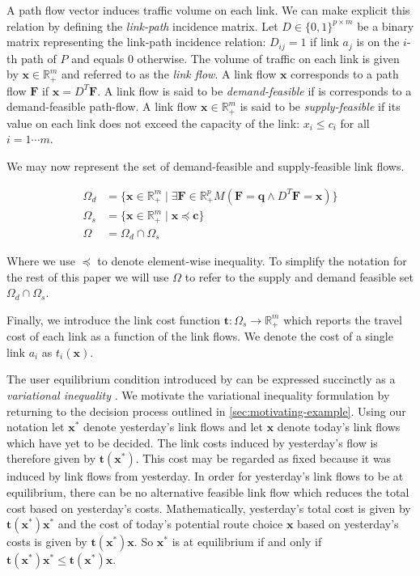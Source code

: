 A path flow vector induces traffic volume on each link.
We can make explicit this relation by defining the \textit{link-path} incidence matrix.
Let $D\in \{0, 1\}^{p\times m}$ be a binary matrix representing the link-path incidence relation: $D_{ij}=1$ if link $a_j$ is on the $i$-th path of $P$ and equals $0$ otherwise. 
The volume of traffic on each link is given by $\mathbf{x}\in \mathbb{R}_+^m$ and referred to as the \textit{link flow}.
A link flow $\mathbf{x}$ corresponds to a path flow $\mathbf{F}$ if $\mathbf{x} = D^T\mathbf{F}$.
A link flow is said to be \textit{demand-feasible} if is corresponds to a demand-feasible path-flow.
A link flow $\mathbf{x}\in \mathbb{R}_+^m$ is said to be \textit{supply-feasible} if its value on each link does not exceed the capacity of the link: $x_i \leq c_i$ for all $i=1\cdots m$.

We may now represent the set of demand-feasible and supply-feasible link flows.

\begin{align}
    \Omega_d &= \{\mathbf{x} \in \mathbb{R}_+^m \mid \exists \mathbf{F} \in \mathbb{R}^p_+ M (\mathbf{F}= \mathbf{q} \land D^T\mathbf{F} = \mathbf{x})\} \label{eqn:demand-feasible-link-flow}\\
    \Omega_s &= \{\mathbf{x} \in \mathbb{R}_+^m \mid \mathbf{x} \preceq \mathbf{c} \} \label{eqn:supply-feasible-link-flow}\\
    \Omega &= \Omega_d \cap \Omega_s
\end{align}

Where we use $\preceq$ to denote element-wise inequality.
To simplify the notation for the rest of this paper we will use $\Omega$ to refer to the supply and demand feasible set $\Omega_d\cap \Omega_s$.

Finally, we introduce the link cost function $\mathbf{t}: \Omega_s \to \mathbb{R}_+^m$ which reports the travel cost of each link as a function of the link flows.
We denote the cost of a single link $a_i$ as $t_i(\mathbf{x})$.

The user equilibrium condition introduced by \citet{wardrop1952some} can be expressed succinctly as a \textit{variational inequality} \citep{smith1979existence,dafermos1980traffic,nagurney2009netecon}.
We motivate the variational inequality formulation by returning to the decision process outlined in \cref{sec:motivating-example}.
Using our notation let $\mathbf{x}^*$ denote yesterday's link flows and let $\mathbf{x}$ denote today's link flows which have yet to be decided.
The link costs induced by yesterday's flow is therefore given by $\mathbf{t}(\mathbf{x}^*)$.
This cost may be regarded as fixed because it was induced by link flows from yesterday.
In order for yesterday's link flows to be at equilibrium, there can be no alternative feasible link flow which reduces the total cost based on yesterday's costs.
Mathematically, yesterday's total cost is given by $\mathbf{t}(\mathbf{x}^*)\mathbf{x}^*$ and the cost of today's potential route choice $\mathbf{x}$ based on yesterday's costs is given by $\mathbf{t}(\mathbf{x}^*)\mathbf{x}$. 
So $\mathbf{x}^*$ is at equilibrium if and only if $\mathbf{t}(\mathbf{x}^*)\mathbf{x}^* \leq \mathbf{t}(\mathbf{x}^*)\mathbf{x}$.

